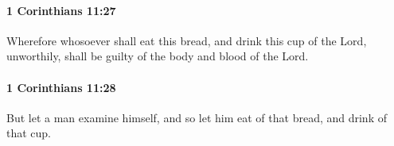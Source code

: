 		\paragraph{1 Corinthians 11:27} %
			\label{1CORINTHIANS-11-27}

			Wherefore whosoever shall eat this bread, and drink this cup of the Lord, unworthily, shall be guilty of the body and blood of the Lord.

			\begin{framed}
				\scriptsize
				\begin{compactdesc}
					\item[SBLG] 
				\end{compactdesc}
			\end{framed}

		\paragraph{1 Corinthians 11:28} %
			\label{1CORINTHIANS-11-28}

			But let a man examine himself, and so let him eat of that bread, and drink of that cup.

